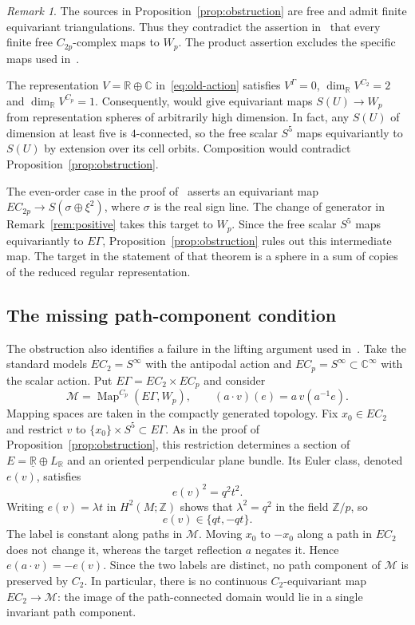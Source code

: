 \documentclass[11pt]{amsart}
\theoremstyle{definition}
\theoremstyle{remark}
\newtheorem{remark}[theorem]{Remark}
\numberwithin{equation}{section}
\newcommand{\R}{\mathbb R}
\newcommand{\C}{\mathbb C}
\newcommand{\Z}{\mathbb Z}
\newcommand{\triv}{\underline{\R}}
\begin{document}
\begin{remark}\label{rem:source}
The sources in Proposition~\ref{prop:obstruction} are free and admit finite equivariant triangulations. Thus they contradict the assertion in~\cite[Lemma~2.6]{Raanes} that every finite free $C_{2p}$-complex maps to $W_p$. The product assertion excludes the specific maps used in~\cite[Theorem~3.7]{Raanes}.

The representation $V=\R\oplus\C$ in~\eqref{eq:old-action} satisfies $V^\Gamma=0$, $\dim_{\R}V^{C_2}=2$ and $\dim_{\R}V^{C_p}=1$. Consequently, \cite[Theorem~4.4]{BasuGhosh} would give equivariant maps $S(U)\to W_p$ from representation spheres of arbitrarily high dimension. In fact, any $S(U)$ of dimension at least five is $4$-connected, so the free scalar $S^5$ maps equivariantly to $S(U)$ by extension over its cell orbits. Composition would contradict Proposition~\ref{prop:obstruction}.

The even-order case in the proof of~\cite[Theorem~3.3]{BasuGhosh} asserts an equivariant map $EC_{2p}\to S(\sigma\oplus\xi^2)$, where $\sigma$ is the real sign line. The change of generator in Remark~\ref{rem:positive} takes this target to $W_p$. Since the free scalar $S^5$ maps equivariantly to $E\Gamma$, Proposition~\ref{prop:obstruction} rules out this intermediate map. The target in the statement of that theorem is a sphere in a sum of copies of the reduced regular representation.
\end{remark}

\subsection{The missing path-component condition}

The obstruction also identifies a failure in the lifting argument used in~\cite[Theorem~4.4]{BasuGhosh}. Take the standard models $EC_2=S^\infty$ with the antipodal action and $EC_p=S^\infty\subset\C^\infty$ with the scalar action. Put $E\Gamma=EC_2\times EC_p$ and consider
\[
 \mathcal M=\operatorname{Map}^{C_p}(E\Gamma,W_p),
 \qquad (a\cdot v)(e)=a\,v(a^{-1}e).
\]
Mapping spaces are taken in the compactly generated topology. Fix $x_0\in EC_2$ and restrict $v$ to $\{x_0\}\times S^5\subset E\Gamma$. As in the proof of Proposition~\ref{prop:obstruction}, this restriction determines a section of $E=\triv\oplus L_\R$ and an oriented perpendicular plane bundle. Its Euler class, denoted $e(v)$, satisfies
\[
 e(v)^2=q^2t^2.
\]
Writing $e(v)=\lambda t$ in $H^2(M;\Z)$ shows that $\lambda^2=q^2$ in the field $\Z/p$, so
\[
 e(v)\in\{qt,-qt\}.
\]
The label is constant along paths in $\mathcal M$. Moving $x_0$ to $-x_0$ along a path in $EC_2$ does not change it, whereas the target reflection $a$ negates it. Hence $e(a\cdot v)=-e(v)$. Since the two labels are distinct, no path component of $\mathcal M$ is preserved by $C_2$. In particular, there is no continuous $C_2$-equivariant map $EC_2\to\mathcal M$: the image of the path-connected domain would lie in a single invariant path component.
\end{document}
